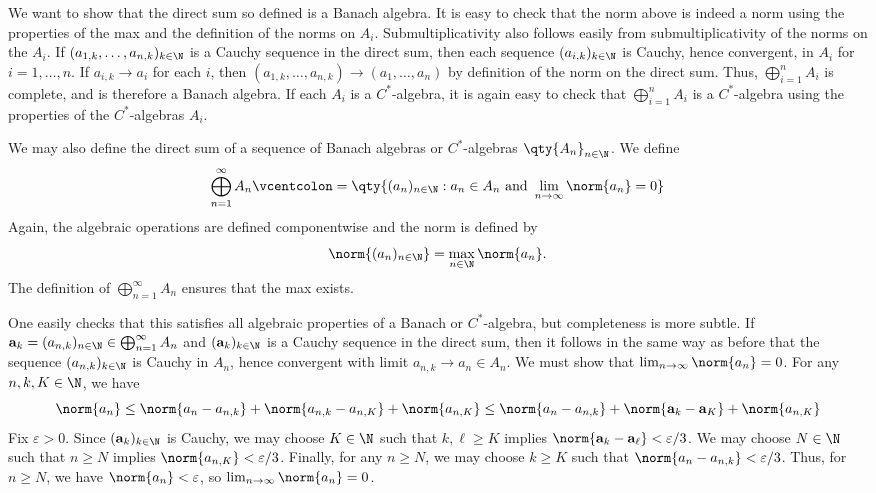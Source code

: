 We want to show that the direct sum so defined is a Banach algebra. It is easy to check that the norm above is indeed a norm using the properties of the max and the definition of the norms on $A_i$. Submultiplicativity also follows easily from submultiplicativity of the norms on the $A_i$. If $(a_{1,k},\ldots, a_{n,k})_{k \in \N}$ is a Cauchy sequence in the direct sum, then each sequence $(a_{i,k})_{k \in \N}$ is Cauchy, hence convergent, in $A_i$ for $i = 1, \ldots, n$. If $a_{i,k} \rightarrow a_i$ for each $i$, then $(a_{1,k},\ldots, a_{n,k}) \rightarrow (a_1,\ldots, a_n)$ by definition of the norm on the direct sum. Thus, $\bigoplus_{i=1}^n A_i$ is complete, and is therefore a Banach algebra. If each $A_i$ is a $C^*$-algebra, it is again easy to check that $\bigoplus_{i=1}^n A_i$ is a $C^*$-algebra using the properties of the $C^*$-algebras $A_i$.


We may also define the direct sum of a sequence of Banach algebras or $C^*$-algebras $\qty{A_n}_{n \in \N}$. We define
\begin{equation}
\bigoplus_{n=1}^\infty A_n \defeq \qty{(a_n)_{n \in \N}: a_n \in A_n \text{ and } \lim_{n \rightarrow \infty} \norm{a_n} = 0}
\end{equation}
Again, the algebraic operations are defined componentwise and the norm is defined by 
\begin{equation}
\norm{(a_n)_{n \in \N}} = \max_{n \in \N} \norm{a_n}.
\end{equation}
The definition of $\bigoplus_{n = 1}^\infty A_n$ ensures that the max exists. 

One easily checks that this satisfies all algebraic properties of a Banach or $C^*$-algebra, but completeness is more subtle. If $\mathbf{a}_k = (a_{n,k})_{n \in \N} \in \bigoplus_{n=1}^\infty A_n$ and $(\mathbf{a}_k)_{k \in \N}$ is a Cauchy sequence in the direct sum, then it follows in the same way as before that the sequence $(a_{n,k})_{k \in \N}$ is Cauchy in $A_n$, hence convergent with limit $a_{n,k} \rightarrow a_n \in A_n$. We must show that $\lim_{n \rightarrow \infty} \norm{a_n} = 0$. For any $n, k, K \in \N$, we have
\begin{equation}
\norm{a_n} \leq \norm{a_n - a_{n,k}} + \norm{a_{n,k} - a_{n,K}} + \norm{a_{n,K}} \leq \norm{a_n - a_{n,k}} + \norm{\mathbf{a}_k - \mathbf{a}_K} + \norm{a_{n,K}}
\end{equation}
Fix $\varepsilon > 0$. Since $(\mathbf{a}_k)_{k \in \N}$ is Cauchy, we may choose $K \in \N$ such that $k, \ell \geq K$ implies $\norm{\mathbf{a}_k - \mathbf{a}_\ell} < \varepsilon/3$. We may choose $N \in \N$ such that $n \geq N$ implies $\norm{a_{n,K}} < \varepsilon/3$. Finally, for any $n \geq N$, we may choose $k \geq K$ such that $\norm{a_n - a_{n,k}} < \varepsilon/3$. Thus, for $n \geq N$, we have $\norm{a_n} < \varepsilon$, so $\lim_{n \rightarrow \infty} \norm{a_n} = 0$.

